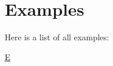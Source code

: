 \section{Examples}
Here is a list of all examples\+:\begin{DoxyCompactItemize}
\item 
\hyperlink{_e-example}{E}
\end{DoxyCompactItemize}
